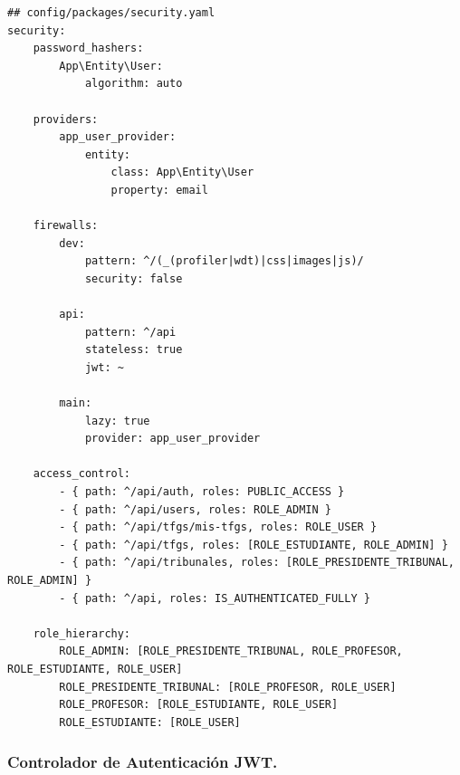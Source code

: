 \documentclass[12pt,a4paper,oneside]{report}
\begin{document}
\begin{lstlisting}
## config/packages/security.yaml
security:
    password_hashers:
        App\Entity\User:
            algorithm: auto

    providers:
        app_user_provider:
            entity:
                class: App\Entity\User
                property: email

    firewalls:
        dev:
            pattern: ^/(_(profiler|wdt)|css|images|js)/
            security: false
            
        api:
            pattern: ^/api
            stateless: true
            jwt: ~
            
        main:
            lazy: true
            provider: app_user_provider

    access_control:
        - { path: ^/api/auth, roles: PUBLIC_ACCESS }
        - { path: ^/api/users, roles: ROLE_ADMIN }
        - { path: ^/api/tfgs/mis-tfgs, roles: ROLE_USER }
        - { path: ^/api/tfgs, roles: [ROLE_ESTUDIANTE, ROLE_ADMIN] }
        - { path: ^/api/tribunales, roles: [ROLE_PRESIDENTE_TRIBUNAL, ROLE_ADMIN] }
        - { path: ^/api, roles: IS_AUTHENTICATED_FULLY }

    role_hierarchy:
        ROLE_ADMIN: [ROLE_PRESIDENTE_TRIBUNAL, ROLE_PROFESOR, ROLE_ESTUDIANTE, ROLE_USER]
        ROLE_PRESIDENTE_TRIBUNAL: [ROLE_PROFESOR, ROLE_USER]
        ROLE_PROFESOR: [ROLE_ESTUDIANTE, ROLE_USER]
        ROLE_ESTUDIANTE: [ROLE_USER]
\end{lstlisting}

\subsubsection{Controlador de Autenticación
JWT.}\label{controlador-de-autenticaciuxf3n-jwt.}
\end{document}
